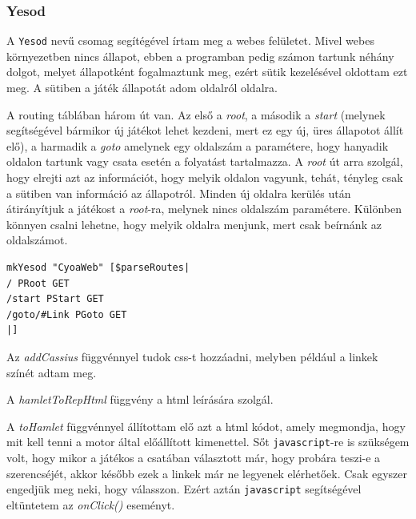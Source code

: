\documentclass[12pt,a4paper,oneside]{report}
\newcommand{\proglang}{\texttt}
\begin{document}
    \subsubsection{Yesod}
      A \proglang{Yesod} nevű csomag segítégével írtam meg a webes
      felületet. Mivel webes környezetben nincs állapot, ebben a
      programban pedig számon tartunk néhány dolgot, melyet állapotként
      fogalmaztunk meg, ezért sütik kezelésével oldottam ezt meg. A
      sütiben a játék állapotát adom oldalról oldalra.

      A routing táblában három út van. Az első a \emph{root}, a második a
      \emph{start} (melynek segítségével bármikor új játékot lehet
      kezdeni, mert ez egy új, üres állapotot állít elő), a harmadik a
      \emph{goto} amelynek egy oldalszám a paramétere, hogy hanyadik
      oldalon tartunk vagy csata esetén a folyatást tartalmazza. A
      \emph{root} út arra szolgál, hogy elrejti azt az információt,
      hogy melyik oldalon vagyunk, tehát, tényleg csak a sütiben van
      információ az állapotról. Minden új oldalra kerülés után
      átirányítjuk a játékost a \emph{root}-ra, melynek nincs
      oldalszám paramétere. Különben könnyen csalni lehetne, hogy
      melyik oldalra menjunk, mert csak beírnánk az oldalszámot.
      \begin{verbatim}
mkYesod "CyoaWeb" [$parseRoutes|
/ PRoot GET
/start PStart GET
/goto/#Link PGoto GET
|]
      \end{verbatim}
      Az \emph{addCassius} függvénnyel tudok css-t hozzáadni, melyben például
      a linkek színét adtam meg.

      A \emph{hamletToRepHtml} függvény a html leírására szolgál.

      A \emph{toHamlet} függvénnyel állítottam elő azt a html kódot, amely
      megmondja, hogy mit kell tenni a motor által előállított
      kimenettel. Sőt \proglang{javascript}-re is szükségem volt, hogy mikor a
      játékos a csatában választott már, hogy probára teszi-e a
      szerencséjét, akkor később ezek a linkek már ne legyenek
      elérhetőek. Csak egyszer engedjük meg neki, hogy
      válasszon. Ezért aztán \proglang{javascript} segítségével eltüntetem az
      \emph{onClick()} eseményt.

  
\end{document}
